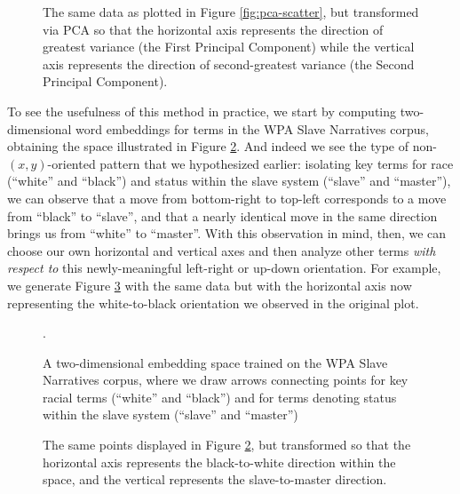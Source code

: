 \documentclass[11pt]{article}
\begin{document}
\begin{figure}
\centering

\caption{The same data as plotted in Figure \ref{fig:pca-scatter}, but transformed via PCA so that the horizontal axis represents the direction of greatest variance (the First Principal Component) while the vertical axis represents the direction of second-greatest variance (the Second Principal Component).}
\label{fig:pca-scatter-transformed}
\end{figure}

To see the usefulness of this method in practice, we start by computing two-dimensional word embeddings for terms in the WPA Slave Narratives corpus, obtaining the space illustrated in Figure \ref{fig:wpa-embeddings}. And indeed we see the type of non-$(x,y)$-oriented pattern that we hypothesized earlier: isolating key terms for race (``white'' and ``black'') and status within the slave system (``slave'' and ``master''), we can observe that a move from bottom-right to top-left corresponds to a move from ``black'' to ``slave'', and that a nearly identical move in the same direction brings us from ``white'' to ``master''. With this observation in mind, then, we can choose our own horizontal and vertical axes and then analyze other terms \textit{with respect to} this newly-meaningful left-right or up-down orientation. For example, we generate Figure \ref{fig:wpa-embeddings-transformed} with the same data but with the horizontal axis now representing the white-to-black orientation we observed in the original plot.

\begin{figure}[ht!]
	\centering
	
	\caption{A two-dimensional embedding space trained on the WPA Slave Narratives corpus, where we draw arrows connecting points for key racial terms (``white'' and ``black'') and for terms denoting status within the slave system (``slave'' and ``master'')}.
	\label{fig:wpa-embeddings}
\end{figure}

\begin{figure}[ht!]
\centering

\caption{The same points displayed in Figure \ref{fig:wpa-embeddings}, but transformed so that the horizontal axis represents the black-to-white direction within the space, and the vertical represents the slave-to-master direction.}
\label{fig:wpa-embeddings-transformed}
\end{figure}
\end{document}
